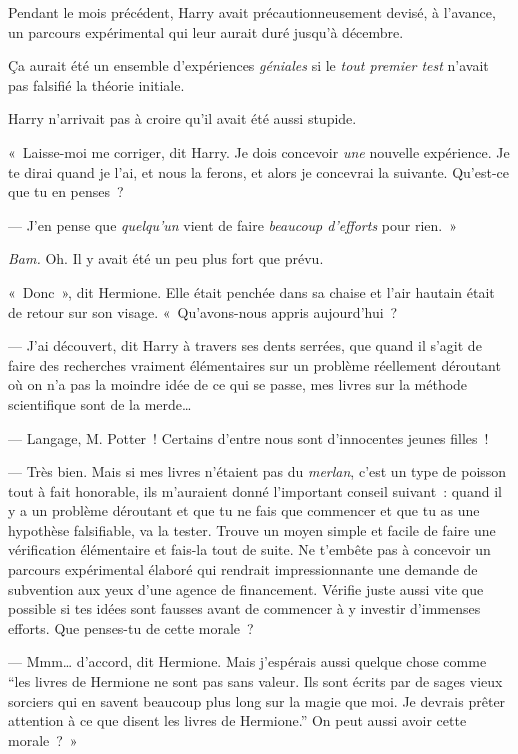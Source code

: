 Pendant le mois précédent, Harry avait précautionneusement devisé, à l'avance, un parcours expérimental qui leur aurait duré jusqu'à décembre.

Ça aurait été un ensemble d'expériences \emph{géniales} si le \emph{tout premier test} n'avait pas falsifié la théorie initiale.

Harry n'arrivait pas à croire qu'il avait été aussi stupide.

«~Laisse-moi me corriger, dit Harry. Je dois concevoir \emph{une} nouvelle expérience. Je te dirai quand je l'ai, et nous la ferons, et alors je concevrai la suivante. Qu'est-ce que tu en penses~?

--- J'en pense que \emph{quelqu'un} vient de faire \emph{beaucoup d'efforts} pour rien.~»

\emph{Bam.} Oh. Il y avait été un peu plus fort que prévu.

«~Donc~», dit Hermione. Elle était penchée dans sa chaise et l'air hautain était de retour sur son visage. «~Qu'avons-nous appris aujourd'hui~?

--- J'ai découvert, dit Harry à travers ses dents serrées, que quand il s'agit de faire des recherches vraiment élémentaires sur un problème réellement déroutant où on n'a pas la moindre idée de ce qui se passe, mes livres sur la méthode scientifique sont de la merde…

--- Langage, M. Potter~! Certains d'entre nous sont d'innocentes jeunes filles~!

--- Très bien. Mais si mes livres n'étaient pas du \emph{merlan}, c'est un type de poisson tout à fait honorable, ils m'auraient donné l'important conseil suivant~: quand il y a un problème déroutant et que tu ne fais que commencer et que tu as une hypothèse falsifiable, va la tester. Trouve un moyen simple et facile de faire une vérification élémentaire et fais-la tout de suite. Ne t'embête pas à concevoir un parcours expérimental élaboré qui rendrait impressionnante une demande de subvention aux yeux d'une agence de financement. Vérifie juste aussi vite que possible si tes idées sont fausses avant de commencer à y investir d'immenses efforts. Que penses-tu de cette morale~?

--- Mmm… d'accord, dit Hermione. Mais j'espérais aussi quelque chose comme “les livres de Hermione ne sont pas sans valeur. Ils sont écrits par de sages vieux sorciers qui en savent beaucoup plus long sur la magie que moi. Je devrais prêter attention à ce que disent les livres de Hermione.” On peut aussi avoir cette morale~?~»

